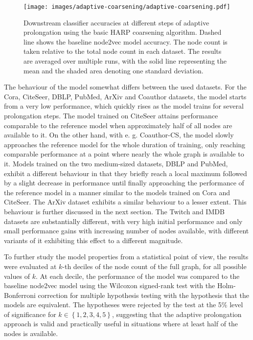 \begin{figure*}
  \centering
  \texttt{[image: images/adaptive-coarsening/adaptive-coarsening.pdf]}
  \caption{Downstream classifier accuracies at different steps of adaptive prolongation using the basic HARP coarsening algorithm. Dashed line shows the baseline node2vec model accuracy. The node count is taken relative to the total node count in each dataset. The results are averaged over multiple runs, with the solid line representing the mean and the shaded area denoting one standard deviation.}
  \label{fig:adaptive-coarsening}
\end{figure*}

The behaviour of the model somewhat differs between the used datasets. For the Cora, CiteSeer, DBLP, PubMed, ArXiv and Coauthor datasets, the model starts from a very low performance, which quickly rises as the model trains for several prolongation steps. The model trained on CiteSeer attains performance comparable to the reference model when approximately half of all nodes are available to it. On the other hand, with e. g. Coauthor-CS, the model slowly approaches the reference model for the whole duration of training, only reaching comparable performance at a point where nearly the whole graph is available to it. Models trained on the two medium-sized datasets, DBLP and PubMed, exhibit a different behaviour in that they briefly reach a local maximum followed by a slight decrease in performance until finally approaching the performance of the reference model in a manner similar to the models trained on Cora and CiteSeer. The ArXiv dataset exhibits a similar behaviour to a lesser extent. This behaviour is further discussed in the next section. The Twitch and IMDB datasets are substantially different, with very high initial performance and only small performance gains with increasing number of nodes available, with different variants of it exhibiting this effect to a different magnitude.

To further study the model properties from a statistical point of view, the results were evaluated at \( k \)-th deciles of the node count of the full graph, for all possible values of \( k \). At each decile, the performance of the model was compared to the baseline node2vec model using the Wilcoxon signed-rank test with the Holm-Bonferroni correction for multiple hypothesis testing with the hypothesis that the models are equivalent. The hypotheses were rejected by the test at the 5\% level of significance for \( k \in \left\{ 1, 2, 3, 4, 5 \right\} \), suggesting that the adaptive prolongation approach is valid and practically useful in situations where at least half of the nodes is available.

